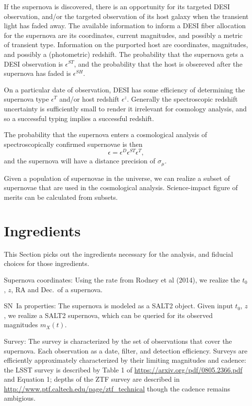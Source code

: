 \documentclass[onecolumn]{aastex61}   	%
\begin{document}
If the supernova is discovered, there is an opportunity for its targeted DESI observation, and/or the targeted
observation of its host galaxy when the transient light has faded away.   The available
information to inform a DESI fiber allocation for the supernova are its coordinates, current magnitudes, and possibly a metric of transient type.
Information on the purported host are coordinates, magnitudes, and possibly a (photometric) redshift.  
The probability that the supernova gets a DESI observation is $\epsilon^{ST}$, and the probability that the host is obsereved
after the supernova has faded is $\epsilon^{SH}$.

On a particular date of observation,
DESI has some efficiency of determining the supernova type  $\epsilon^T$ and/or host redshift $\epsilon^z$. 
Generally the spectroscopic redshift uncertainty is sufficiently small to render it irrelevant
for cosmology analysis, and so a successful typing implies a successful redshift.

The probability that the supernova enters a cosmological analysis of spectroscopically confirmed supernovae is then
\begin{equation}
\epsilon = \epsilon^D \epsilon^{ST} \epsilon^T,
\end{equation}
and the supernova will have a distance precision of $\sigma_\mu$.

Given a population of supernovae in the universe, we can realize a subset of supernovae that are used in the cosmological analysis.
Science-impact figure of merits can be calculated from subsets.

\section{Ingredients}
This Section picks out the ingredients necessary for the analysis, and fiducial choices for those ingredients.

Supernova coordinates:  Using the rate from Rodney et al (2014),  we realize the $t_0$, $z$, RA and Dec.\ of a supernova.

SN~Ia properties: The supernova is modeled as a SALT2 object.  Given input $t_0$, $z$, we realize a SALT2 supernova,
which can be queried for its observed magnitudes $m_X(t)$.

Survey: The survey is characterized by the set of observations that cover the supernova.  Each observation as a date, filter, and detection efficiency.
Surveys are efficiently approximately characterized by their limiting magnitudes and cadence:
the LSST survey is described by Table 1 of  \url{https://arxiv.org/pdf/0805.2366.pdf} and Equation 1;
depths of the ZTF survey are described in \url{http://www.ptf.caltech.edu/page/ztf_technical} though the cadence remains ambigious.
\end{document}
